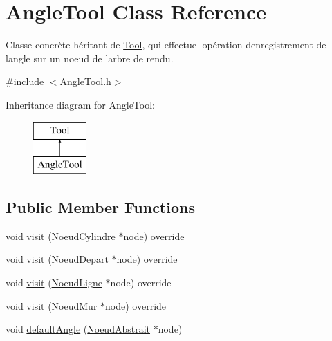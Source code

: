 \hypertarget{class_angle_tool}{}\section{Angle\+Tool Class Reference}
\label{class_angle_tool}


Classe concrète héritant de \hyperlink{class_tool}{Tool}, qui effectue l\textquotesingle{}opération d\textquotesingle{}enregistrement de l\textquotesingle{}angle sur un noeud de l\textquotesingle{}arbre de rendu.  




{\ttfamily \#include $<$Angle\+Tool.\+h$>$}

Inheritance diagram for Angle\+Tool\+:\begin{figure}[H]
\begin{center}
\leavevmode
\includegraphics[height=2.000000cm]{class_angle_tool}
\end{center}
\end{figure}
\subsection*{Public Member Functions}
\begin{DoxyCompactItemize}
\item 
void \hyperlink{group__inf2990_ga925fee2b000babaae1c7947a732a0bba}{visit} (\hyperlink{class_noeud_cylindre}{Noeud\+Cylindre} $\ast$node) override
\item 
void \hyperlink{group__inf2990_gaaa2fc24bde51948c2288c375f19d70ae}{visit} (\hyperlink{class_noeud_depart}{Noeud\+Depart} $\ast$node) override
\item 
void \hyperlink{group__inf2990_gada17fc323e1e8d6968fef2b20186e4a6}{visit} (\hyperlink{class_noeud_ligne}{Noeud\+Ligne} $\ast$node) override
\item 
void \hyperlink{group__inf2990_ga5bf124eb8955a829e87743cc6a737b49}{visit} (\hyperlink{class_noeud_mur}{Noeud\+Mur} $\ast$node) override
\item 
void \hyperlink{group__inf2990_gac864ba35d8073ed9564a0a90d4df351d}{default\+Angle} (\hyperlink{class_noeud_abstrait}{Noeud\+Abstrait} $\ast$node)
\end{DoxyCompactItemize}



